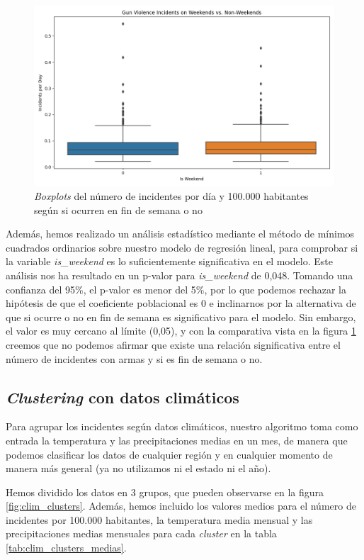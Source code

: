 \documentclass[11pt,a4paper]{article}
\begin{document}
\begin{figure}[H]
    \centering
    \includegraphics[width=.8\linewidth]{weekend_boxplot.png}
    \caption{\textit{Boxplots} del número de incidentes por día y 100.000 habitantes según si ocurren en fin de semana o no}
    \label{fig:weekend_boxplot}
\end{figure}

Además, hemos realizado un análisis estadístico mediante el método de mínimos cuadrados ordinarios sobre nuestro modelo de regresión lineal, para comprobar si la variable \textit{is\_weekend} es lo suficientemente significativa en el modelo. Este análisis nos ha resultado en un p-valor para \textit{is\_weekend} de 0,048. Tomando una confianza del 95\%, el p-valor es menor del 5\%, por lo que podemos rechazar la hipótesis de que el coeficiente poblacional es 0 e inclinarnos por la alternativa de que si ocurre o no en fin de semana es significativo para el modelo. Sin embargo, el valor es muy cercano al límite (0,05), y con la comparativa vista en la figura \ref{fig:weekend_boxplot} creemos que no podemos afirmar que existe una relación significativa entre el número de incidentes con armas y si es fin de semana o no.

\subsection{\textit{Clustering} con datos climáticos}

Para agrupar los incidentes según datos climáticos, nuestro algoritmo toma como entrada la temperatura y las precipitaciones medias en un mes, de manera que podemos clasificar los datos de cualquier región y en cualquier momento de manera más general (ya no utilizamos ni el estado ni el año).

Hemos dividido los datos en 3 grupos, que pueden observarse en la figura \ref{fig:clim_clusters}. Además, hemos incluido los valores medios para el número de incidentes por 100.000 habitantes, la temperatura media mensual y las precipitaciones medias mensuales para cada \textit{cluster} en la tabla \ref{tab:clim_clusters_medias}.
\end{document}

